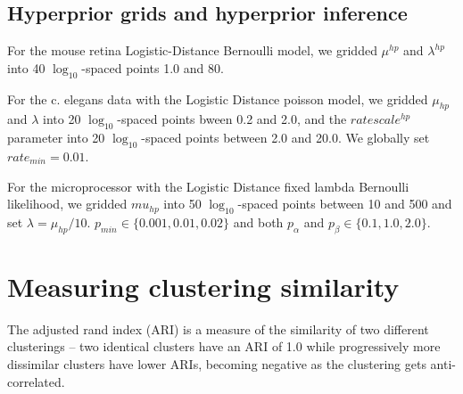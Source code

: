 \documentclass{article}
\begin{document}
\subsection*{Hyperprior grids and hyperprior inference}
\label{supp:hyperpriors}

For the mouse retina Logistic-Distance Bernoulli model, we gridded
$\mu^{hp}$ and $\lambda^{hp}$ into 40 $\log_{10}$-spaced points 1.0
and 80. 

For the c. elegans data with the Logistic Distance poisson model, we
gridded $\mu_{hp}$ and $\lambda$ into 20 $\log_{10}$-spaced points
bween 0.2 and 2.0, and the $ratescale^{hp}$ parameter into 20
$\log_{10}$-spaced points between 2.0 and 20.0. We globally set
$rate_{min}=0.01$.

For the microprocessor with the Logistic Distance fixed lambda
Bernoulli likelihood, we gridded $mu_{hp}$ into 50 $\log_{10}$-spaced
points between 10 and 500 and set $\lambda=\mu_{hp}/10$. $p_{min} \in
\{0.001, 0.01, 0.02\}$ and both $p_\alpha$ and $p_\beta \in \{0.1,
1.0, 2.0\}$.

\section*{Measuring clustering similarity}
The adjusted rand index (ARI) is a measure of the similarity of two
different clusterings \autocite{Hubert1985} -- two identical clusters
have an ARI of 1.0 while progressively more dissimilar clusters have
lower ARIs, becoming negative as the clustering gets anti-correlated.
\end{document}
